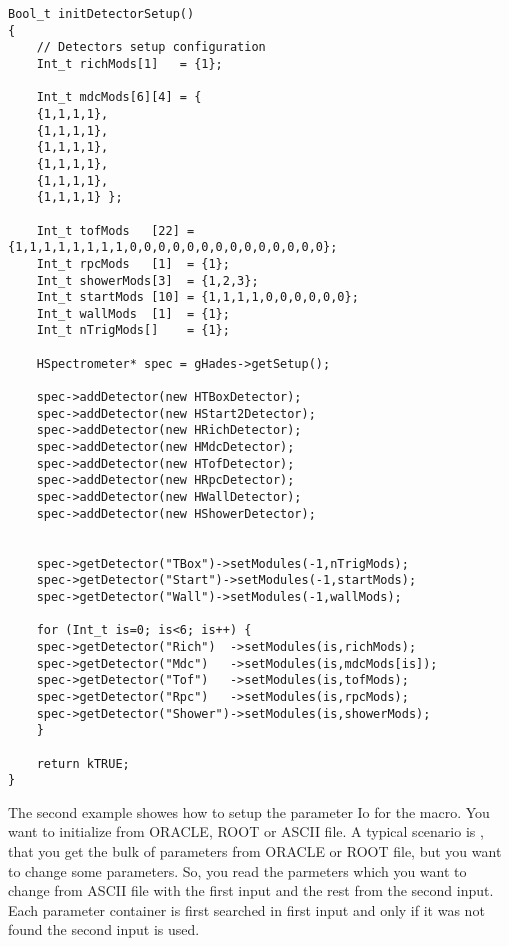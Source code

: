 \begin{lstlisting}
Bool_t initDetectorSetup()
{
    // Detectors setup configuration
    Int_t richMods[1]   = {1};

    Int_t mdcMods[6][4] = {
	{1,1,1,1},
	{1,1,1,1},
	{1,1,1,1},
	{1,1,1,1},
	{1,1,1,1},
	{1,1,1,1} };

    Int_t tofMods   [22] = {1,1,1,1,1,1,1,1,0,0,0,0,0,0,0,0,0,0,0,0,0,0};
    Int_t rpcMods   [1]  = {1};
    Int_t showerMods[3]  = {1,2,3};
    Int_t startMods [10] = {1,1,1,1,0,0,0,0,0,0};
    Int_t wallMods  [1]  = {1};
    Int_t nTrigMods[]    = {1};

    HSpectrometer* spec = gHades->getSetup();

    spec->addDetector(new HTBoxDetector);
    spec->addDetector(new HStart2Detector);
    spec->addDetector(new HRichDetector);
    spec->addDetector(new HMdcDetector);
    spec->addDetector(new HTofDetector);
    spec->addDetector(new HRpcDetector);
    spec->addDetector(new HWallDetector);
    spec->addDetector(new HShowerDetector);


    spec->getDetector("TBox")->setModules(-1,nTrigMods);
    spec->getDetector("Start")->setModules(-1,startMods);
    spec->getDetector("Wall")->setModules(-1,wallMods);

    for (Int_t is=0; is<6; is++) {
	spec->getDetector("Rich")  ->setModules(is,richMods);
	spec->getDetector("Mdc")   ->setModules(is,mdcMods[is]);
	spec->getDetector("Tof")   ->setModules(is,tofMods);
	spec->getDetector("Rpc")   ->setModules(is,rpcMods);
	spec->getDetector("Shower")->setModules(is,showerMods);
    }

    return kTRUE;
}
\end{lstlisting} \label{setup_spectrometer}
\clearpage

The second example showes how to setup the parameter Io for the macro.
You want to initialize from ORACLE, ROOT or ASCII file. A typical
scenario is , that you get the bulk of parameters from ORACLE or
ROOT file, but you want to change some parameters. So, you read
the parmeters which you want to change from ASCII file with the
first input and the rest from the second input. Each parameter
container is first searched in first input and only if it was not 
found the second input is used.


